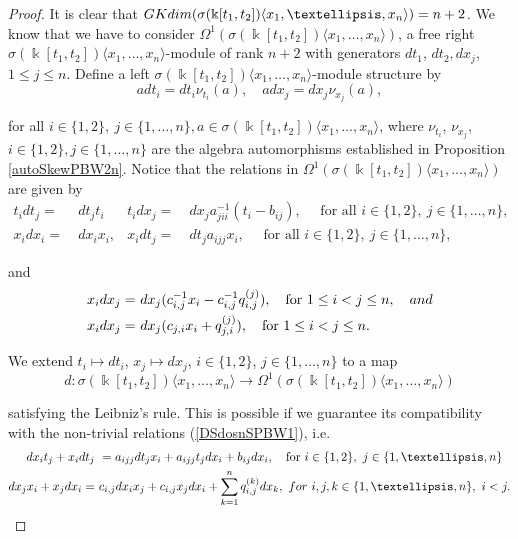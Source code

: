 \documentclass{amsart}
\theoremstyle{definition}
\theoremstyle{remark}
\numberwithin{equation}{section}
\begin{document}
\begin{proof}
It is clear that ${\rm GKdim}(\sigma(\Bbbk[t_1, t_2])\langle x_1, \ldots, x_n\rangle) = n+2$. We know that we have to consider $\Omega^{1}(\sigma(\Bbbk[t_1, t_2])\langle x_1, \ldots, x_n\rangle)$, a free right $\sigma(\Bbbk[t_1, t_2])\langle x_1, \ldots, x_n\rangle$-module of rank $n+2$ with generators $dt_1$, $dt_2, dx_j$, $1\leq j \leq n$. Define a left $\sigma(\Bbbk[t_1, t_2])\langle x_1, \ldots, x_n\rangle$-module structure by
    \begin{equation}\label{relrightmod32n}
        adt_i = dt_i \nu_{t_i}(a), \quad adx_j = dx_j\nu_{x_j}(a),  
    \end{equation}

for all $i\in\{1, 2\},\ j \in\{1, \ldots, n\},  a\in \sigma(\Bbbk[t_1, t_2])\langle x_1, \ldots, x_n\rangle$, where $\nu_{t_i}$, $\nu_{x_j}$, $i\in\{1, 2\}, j \in\{1, \ldots, n\}$ are the algebra automorphisms established in Proposition \ref{autoSkewPBW2n}. Notice that the relations in $\Omega^{1}(\sigma(\Bbbk[t_1, t_2])\langle x_1, \ldots, x_n\rangle)$ are given by
    \begin{align}
        t_idt_j = &\ dt_j t_i & t_idx_j = &\ dx_ja_{jii}^{-1}(t_i-b_{ij}), \quad \text{ for all } i\in\{1, 2\}, \ j \in\{1, \ldots, n\}, \label{reltxn}  \\
        x_idx_i = &\ dx_ix_i,  &  x_idt_j = &\ dt_ja_{ijj}x_i, \quad \text{ for all } i\in\{1, 2\}, \ j \in\{1, \ldots, n\}, \label{reltxn.} 
         \end{align}

and 
        \begin{align}
        x_idx_j = &\ dx_j(c_{i,j}^{-1}x_i-c_{i,j}^{-1}q_{i,j}^{(j)}), \quad \text{for}\ 1\leq i < j \leq n, \quad {\rm and} \\
        x_idx_j = &\ dx_j(c_{j,i}x_i + q_{j,i}^{(j)}), \quad \text{for}\ 1\leq i < j \leq n.  \label{relxxn} 
    \end{align}

We extend $t_i\mapsto dt_i$, $x_j\mapsto dx_j$, $i \in \{1, 2\}$, $j \in \{1, \ldots, n\}$ to a map 
$$
d: \sigma(\Bbbk[t_1, t_2])\langle x_1, \ldots, x_n\rangle \to \Omega^{1}(\sigma(\Bbbk[t_1, t_2])\langle x_1, \ldots, x_n\rangle)
$$ 

satisfying the Leibniz's rule. This is possible if we guarantee its compatibility with the non-trivial relations {\rm (}\ref{DSdosnSPBW1}{\rm )}, i.e.
\begin{align*}
        dx_it_j+x_idt_j &\ = a_{ijj}dt_jx_i+a_{ijj}t_jdx_i+b_{ij}dx_i, \quad \text{for}\ i\in\{1, 2\}, \ j \in\{1, \ldots, n\} \\
         dx_j x_i+x_jdx_i = &\ c_{i, j}dx_i x_j+c_{i,j}x_jdx_i + \sum_{k=1}^{n}q_{i,j}^{(k)}dx_k, \ {\rm for}\ i, j, k \in \{1, \ldots, n\}, \ i < j.
    \end{align*}
    

\end{proof}
\end{document}
